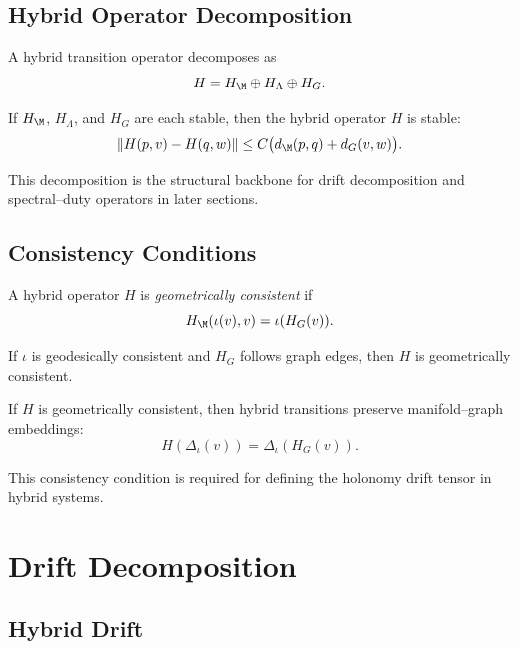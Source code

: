 \subsection{Hybrid Operator Decomposition}

\begin{definition}
A hybrid transition operator decomposes as
\[
H = H_\M \oplus H_\Lambda \oplus H_G.
\]
\end{definition}

\begin{theorem}
If $H_\M$, $H_\Lambda$, and $H_G$ are each stable, then the hybrid operator
$H$ is stable:
\[
\| H(p,v) - H(q,w) \|
\le C \big( d_\M(p,q) + d_G(v,w) \big).
\]
\end{theorem}

\begin{remark}
This decomposition is the structural backbone for drift decomposition and
spectral–duty operators in later sections.
\end{remark}

\subsection{Consistency Conditions}

\begin{definition}
A hybrid operator $H$ is \emph{geometrically consistent} if
\[
H_\M(\iota(v),v) = \iota(H_G(v)).
\]
\end{definition}

\begin{lemma}
If $\iota$ is geodesically consistent and $H_G$ follows graph edges, then
$H$ is geometrically consistent.
\end{lemma}

\begin{theorem}
If $H$ is geometrically consistent, then hybrid transitions preserve
manifold--graph embeddings:
\[
H(\Delta_\iota(v)) = \Delta_\iota(H_G(v)).
\]
\end{theorem}

\begin{remark}
This consistency condition is required for defining the holonomy drift
tensor in hybrid systems.
\end{remark}

\section{Drift Decomposition}

\subsection{Hybrid Drift}

